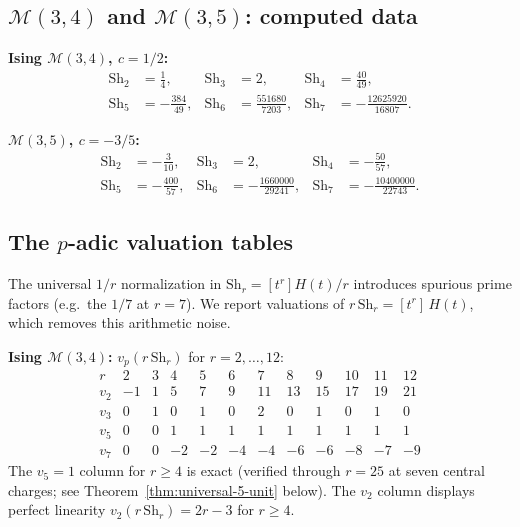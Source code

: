 \documentclass[11pt]{article}
\newcommand{\cM}{\mathcal{M}}
\begin{document}
\subsection*{$\cM(3,4)$ and $\cM(3,5)$: computed data}

\noindent\textbf{Ising $\cM(3,4)$, $c = 1/2$:}
\begin{align*}
\mathrm{Sh}_2 &= \tfrac{1}{4}, &
\mathrm{Sh}_3 &= 2, &
\mathrm{Sh}_4 &= \tfrac{40}{49}, \\
\mathrm{Sh}_5 &= -\tfrac{384}{49}, &
\mathrm{Sh}_6 &= \tfrac{551680}{7203}, &
\mathrm{Sh}_7 &= -\tfrac{12625920}{16807}.
\end{align*}

\noindent\textbf{$\cM(3,5)$, $c = -3/5$:}
\begin{align*}
\mathrm{Sh}_2 &= -\tfrac{3}{10}, &
\mathrm{Sh}_3 &= 2, &
\mathrm{Sh}_4 &= -\tfrac{50}{57}, \\
\mathrm{Sh}_5 &= -\tfrac{400}{57}, &
\mathrm{Sh}_6 &= -\tfrac{1660000}{29241}, &
\mathrm{Sh}_7 &= -\tfrac{10400000}{22743}.
\end{align*}

\subsection*{The $p$-adic valuation tables}

The universal $1/r$ normalization in
$\mathrm{Sh}_r = [t^r] H(t) / r$ introduces spurious
prime factors (e.g.\ the $1/7$ at $r = 7$).  We report
valuations of $r\,\mathrm{Sh}_r = [t^r]\,H(t)$, which
removes this arithmetic noise.

\medskip
\noindent\textbf{Ising $\cM(3,4)$:}
$v_p(r\,\mathrm{Sh}_r)$ for $r = 2, \ldots, 12$:
\[
\begin{array}{c|rrrrrrrrrrr}
r & 2 & 3 & 4 & 5 & 6 & 7 & 8 & 9 & 10 & 11 & 12 \\
\hline
v_2 & -1 & 1 & 5 & 7 & 9 & 11 & 13 & 15 & 17 & 19 & 21 \\
v_3 & 0 & 1 & 0 & 1 & 0 & 2 & 0 & 1 & 0 & 1 & 0 \\
v_5 & 0 & 0 & 1 & 1 & 1 & 1 & 1 & 1 & 1 & 1 & 1 \\
v_7 & 0 & 0 & -2 & -2 & -4 & -4 & -6 & -6 & -8 & -7 & -9
\end{array}
\]
The $v_5 = 1$ column for $r \ge 4$ is exact (verified through
$r = 25$ at seven central charges; see
Theorem~\ref{thm:universal-5-unit} below).
The $v_2$ column displays perfect linearity
$v_2(r\,\mathrm{Sh}_r) = 2r - 3$ for $r \ge 4$.
\end{document}
